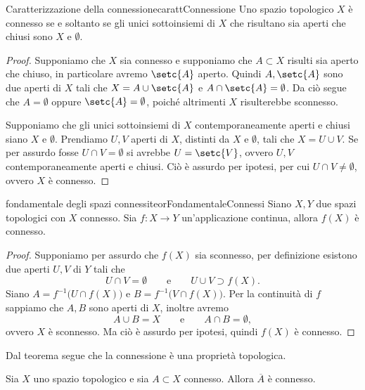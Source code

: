 \begin{prop}{Caratterizzazione della connessione}{carattConnessione}
	Uno spazio topologico \(X\) è connesso se e soltanto se gli unici sottoinsiemi di \(X\) che risultano sia aperti che chiusi sono \(X\) e \(\emptyset\).
\end{prop}

\begin{proof}
	\graffito{\(\Rightarrow)\)}Supponiamo che \(X\) sia connesso e supponiamo che \(A\subset X\) risulti sia aperto che chiuso, in particolare avremo \(\setc{A}\) aperto.
	Quindi \(A,\setc{A}\) sono due aperti di \(X\) tali che \(X=A\cup\setc{A}\) e \(A\cap\setc{A}=\emptyset\).
	Da ciò segue che \(A=\emptyset\) oppure \(\setc{A}=\emptyset\), poiché altrimenti \(X\) risulterebbe sconnesso.

	\graffito{\(\Leftarrow)\)}Supponiamo che gli unici sottoinsiemi di \(X\) contemporaneamente aperti e chiusi siano \(X\) e \(\emptyset\).
	Prendiamo \(U,V\) aperti di \(X\), distinti da \(X\) e \(\emptyset\), tali che \(X=U\cup V\). Se per assurdo fosse \(U\cap V=\emptyset\) si avrebbe \(U=\setc{V}\), ovvero \(U,V\) contemporaneamente aperti e chiusi.
	Ciò è assurdo per ipotesi, per cui \(U\cap V\neq\emptyset\), ovvero \(X\) è connesso.
\end{proof}

\begin{teor}{fondamentale degli spazi connessi}{teorFondamentaleConnessi}
	Siano \(X,Y\) due spazi topologici con \(X\) connesso.
	Sia \(f\colon X\to Y\) un'applicazione continua, allora \(f(X)\) è connesso.
\end{teor}

\begin{proof}
	Supponiamo per assurdo che \(f(X)\) sia sconnesso, per definizione esistono due aperti \(U,V\) di \(Y\) tali che
	\[
		U \cap V = \emptyset \qquad\text{e}\qquad U \cup V \supset f(X).
	\]
	Siano \(A=f^{-1}\big( U \cap f(X) \big)\) e \(B=f^{-1}\big( V \cap f(X) \big)\).
	Per la continuità di \(f\) sappiamo che \(A,B\) sono aperti di \(X\), inoltre avremo
	\[
		A \cup B = X \qquad\text{e}\qquad A \cap B = \emptyset,
	\]
	ovvero \(X\) è sconnesso.
	Ma ciò è assurdo per ipotesi, quindi \(f(X)\) è connesso.
\end{proof}

\begin{oss}
	Dal teorema segue che la connessione è una proprietà topologica.
\end{oss}

\begin{pr}\label{pr:conn1}
	Sia \(X\) uno spazio topologico e sia \(A\subset X\) connesso.
	Allora \(\overline{A}\) è connesso.
\end{pr}

